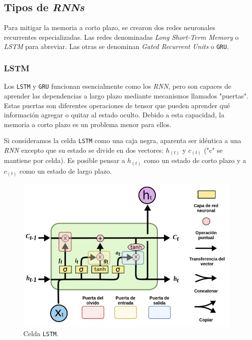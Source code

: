 \documentclass[a4paper,12pt]{article}
\begin{document}
\subsection{Tipos de \textit{RNNs}}
Para mitigar la memoria a corto plazo, se crearon dos redes neuronales recurrentes especializadas. Las redes denominadas \textit{Long Short-Term Memory} o \textit{LSTM} para abreviar. Las otras se denominan \textit{Gated Recurrent Units} o \texttt{GRU}.

\subsubsection{LSTM}
Los \texttt{LSTM} y \texttt{GRU} funcionan esencialmente como los \textit{RNN}, pero son capaces de aprender las dependencias a largo plazo mediante mecanismos llamados "puertas". Estas puertas son diferentes operaciones de tensor que pueden aprender qué información agregar o quitar al estado oculto. Debido a esta capacidad, la memoria a corto plazo es un problema menor para ellos. \citep{olahlstm}

Si consideramos la celda \texttt{LSTM} como una caja negra, aparenta ser idéntica a una \textit{RNN} excepto que su estado se divide en dos vectores: $h_{(t)}$ y $c_{(t)}$ ("c" se mantiene por celda). Es posible pensar a $h_{(t)}$ como un estado de corto plazo y a $c_{(t)}$ como un estado de largo plazo.

\begin{figure}[H]
	\begin{center}				
		\includegraphics[width=1\textwidth]{lstmcell5.png}
		\caption{Celda \texttt{LSTM}.}
		\label{fig:lstmcell}
	\end{center}
\end{figure}
\end{document}
